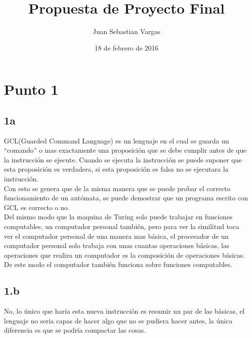 \documentclass[aps,prl,reprint,rmp]{revtex4-1}
\begin{document}
\title{Propuesta de Proyecto Final}


\author{Juan Sebastian Vargas}
 

\date{18 de febrero de 2016}

\setlength{\columnsep}{1cm}






\maketitle



\section{Punto 1}


\subsection{1a}
GCL(Guarded Command Language) es un lenguaje en el cual se guarda un “comando” o mas exactamente una proposición que se debe cumplir antes de que la instrucción se ejecute. Cuando se ejecuta la instrucción se puede suponer que esta proposición es verdadera, si esta proposición es falsa no se ejecutara la instrucción.\\

Con esto se genera que de la misma manera que se puede probar el correcto funcionamiento de un autómata, se puede demostrar que un programa escrito con GCL es correcto o no.\\ 

Del mismo modo que la maquina de Turing solo puede trabajar en funciones computables, un computador personal también, pero para ver la similitud toca ver el computador personal de una manera mas básica, el procesador de un computador personal solo trabaja con unas cuantas operaciones básicas, las operaciones que realiza un computador es la composición de operaciones básicas. De este modo el computador también funciona sobre funciones computables.




 
\subsection{1.b}

No, lo único que haría esta nueva instrucción es resumir un par de las básicas, el lenguaje no seria capas de hacer algo que no se pudiera hacer antes, la única diferencia es que se podría compactar las cosas.
\end{document}
